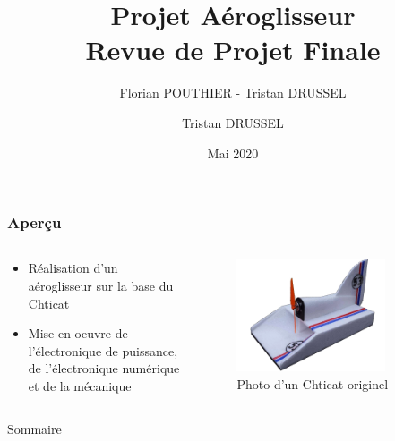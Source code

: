 \documentclass{beamer}
\title[Revue de projet Final]{Projet Aéroglisseur \\Revue de Projet Finale}
\author[]{Florian POUTHIER - Tristan DRUSSEL}
\date{Mai 2020}
\institute{4ème année Génie Électrique \\ INSA Strasbourg}
\begin{document}
	\begin{frame}
		\titlepage
	\end{frame}
	\author[]{Tristan DRUSSEL}
	\begin{frame}
		\frametitle{Aperçu}
		\begin{columns}[T]
	  		\begin{column}{0.5\textwidth}
	  		\begin{itemize}
	  			\item Réalisation d'un aéroglisseur sur la base du Chticat
				\item Mise en oeuvre de l'électronique de puissance, de l'électronique numérique et de la mécanique
	  		\end{itemize}
	    	
	  		\end{column}
	  		\begin{column}{0.5\textwidth}
	  			\begin{figure}
	    			\includegraphics[width=0.8\textwidth]{../Illus/Chticat.png}
	    			\caption{Photo d'un Chticat originel}
	    		 \end{figure}
	  		\end{column}
		\end{columns}
	\end{frame}
	\begin{frame}{Sommaire}
		\setcounter{tocdepth}{1}
		\tableofcontents
	\end{frame}
\end{document}
